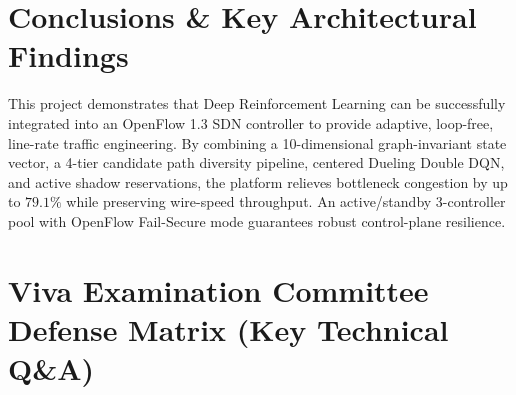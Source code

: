 \documentclass[10pt,a4paper]{article}
\begin{document}
\newpage


\section{Conclusions \& Key Architectural Findings}
This project demonstrates that Deep Reinforcement Learning can be successfully integrated into an OpenFlow 1.3 SDN controller to provide adaptive, loop-free, line-rate traffic engineering. By combining a 10-dimensional graph-invariant state vector, a 4-tier candidate path diversity pipeline, centered Dueling Double DQN, and active shadow reservations, the platform relieves bottleneck congestion by up to $79.1\%$ while preserving wire-speed throughput. An active/standby 3-controller pool with OpenFlow Fail-Secure mode guarantees robust control-plane resilience.

\section{Viva Examination Committee Defense Matrix (Key Technical Q\&A)}
\end{document}
